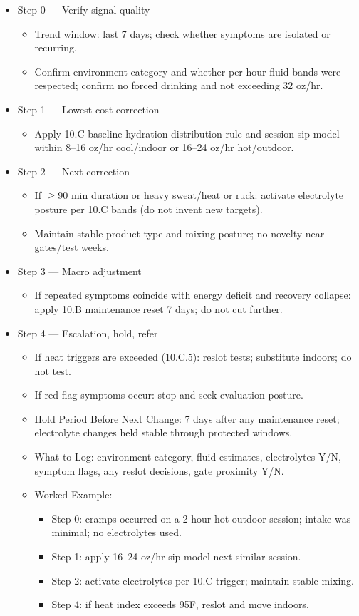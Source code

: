 \documentclass[10pt]{article}
\begin{document}
\begin{itemize}
\item Step 0 — Verify signal quality
  \begin{itemize}
  \item Trend window: last 7 days; check whether symptoms are isolated or recurring.
  \item Confirm environment category and whether per-hour fluid bands were respected; confirm no forced drinking and not exceeding 32 oz/hr.
  \end{itemize}
\item Step 1 — Lowest-cost correction
  \begin{itemize}
  \item Apply 10.C baseline hydration distribution rule and session sip model within 8–16 oz/hr cool/indoor or 16–24 oz/hr hot/outdoor.
  \end{itemize}
\item Step 2 — Next correction
  \begin{itemize}
  \item If $\geq$90 min duration or heavy sweat/heat or ruck: activate electrolyte posture per 10.C bands (do not invent new targets).
  \item Maintain stable product type and mixing posture; no novelty near gates/test weeks.
  \end{itemize}
\item Step 3 — Macro adjustment
  \begin{itemize}
  \item If repeated symptoms coincide with energy deficit and recovery collapse: apply 10.B maintenance reset 7 days; do not cut further.
  \end{itemize}
\item Step 4 — Escalation, hold, refer
  \begin{itemize}
  \item If heat triggers are exceeded (10.C.5): reslot tests; substitute indoors; do not test.
  \item If red-flag symptoms occur: stop and seek evaluation posture.
  \item Hold Period Before Next Change: 7 days after any maintenance reset; electrolyte changes held stable through protected windows.
  \item What to Log: environment category, fluid estimates, electrolytes Y/N, symptom flags, any reslot decisions, gate proximity Y/N.
  \item Worked Example:
    \begin{itemize}
    \item Step 0: cramps occurred on a 2-hour hot outdoor session; intake was minimal; no electrolytes used.
    \item Step 1: apply 16–24 oz/hr sip model next similar session.
    \item Step 2: activate electrolytes per 10.C trigger; maintain stable mixing.
    \item Step 4: if heat index exceeds 95\textdegree F, reslot and move indoors.
    \end{itemize}
  \end{itemize}
\end{itemize}
\end{document}
